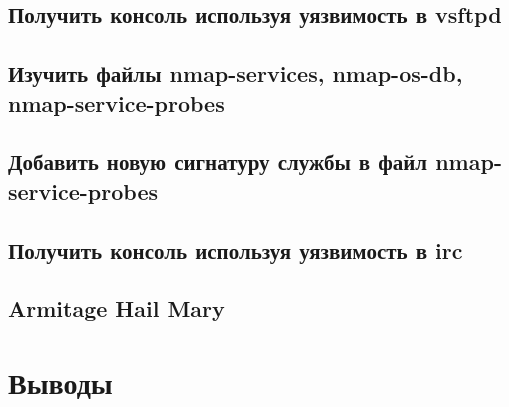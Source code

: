 \documentclass[12pt,a4paper]{article}
\begin{document}
\subsection{Получить консоль используя уязвимость в vsftpd}

\subsection{Изучить файлы nmap-services, nmap-os-db, nmap-service-probes}

\subsection{Добавить новую сигнатуру службы в файл nmap-service-probes}

\subsection{Получить консоль используя уязвимость в irc}
\subsection{Armitage Hail Mary}

\section{Выводы}
\end{document}
